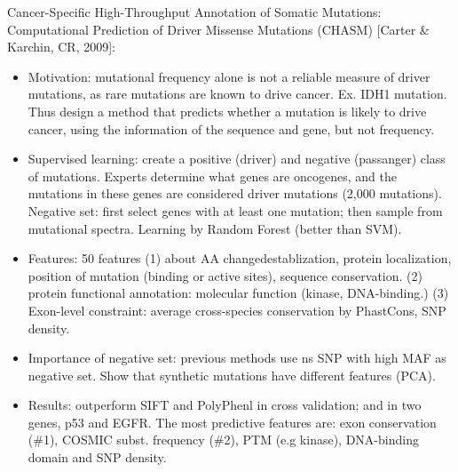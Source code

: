 \documentclass{report}
\begin{document}
Cancer-Specific High-Throughput Annotation of Somatic Mutations: Computational Prediction of Driver Missense Mutations (CHASM) [Carter \& Karchin, CR, 2009]: 
\begin{itemize}
	\item Motivation: mutational frequency alone is not a reliable measure of driver mutations, as rare mutations are known to drive cancer. Ex. IDH1 mutation. Thus design a method that predicts whether a mutation is likely to drive cancer, using the information of the sequence and gene, but not frequency. 
	
	\item Supervised learning: create a positive (driver) and negative (passanger) class of mutations. Experts determine what genes are oncogenes, and the mutations in these genes are considered driver mutations (2,000 mutations). Negative set: first select genes with at least one mutation; then sample from mutational spectra. Learning by Random Forest (better than SVM). 
	
	\item Features: 50 features (1) about AA changedestablization, protein localization, position of mutation (binding or active sites), sequence conservation. (2) protein functional annotation: molecular function (kinase, DNA-binding.) (3) Exon-level constraint: average cross-species conservation by PhastCons, SNP density. 
	
	\item Importance of negative set:  previous methods use ns SNP with high MAF as negative set. Show that synthetic mutations have different features (PCA). 
	
	\item Results: outperform SIFT and PolyPhenl in cross validation; and in two genes, p53 and EGFR. The most predictive features are: exon conservation (\#1), COSMIC subst. frequency (\#2), PTM (e.g kinase), DNA-binding domain and SNP density.
\end{itemize}
\end{document}
